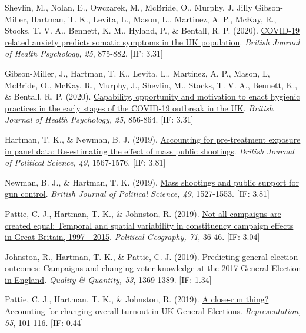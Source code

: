 \documentclass[12pt]{article}
\begin{document}
\begin{bibenum}
	\item Shevlin, M., Nolan, E., Owczarek, M., McBride, O., Murphy, J. Jilly Gibson-Miller, 
	Hartman, T. K., Levita, L., Mason, L., Martinez, A. P., McKay, R., Stocks, T. V. A., 
	Bennett, K. M., Hyland, P., \& Bentall, R. P. (2020). 
		\href{https://10.1111/bjhp.12430}{COVID-19 related anxiety predicts somatic 
		symptoms in the UK population}.
	 	\emph{British Journal of Health Psychology, 25}, 875-882. [IF: 3.31]

	\item Gibson-Miller, J., Hartman, T. K., Levita, L., Martinez, A. P., Mason, L, 
	McBride, O., McKay, R., Murphy, J., Shevlin, M., Stocks, T. V. A., Bennett, K., 
	\& Bentall, R. P. (2020). 
		\href{https://10.1111/bjhp.12426}{Capability, opportunity and motivation 
		to enact hygienic practices in the early stages of the COVID-19 outbreak in the UK}.
		\emph{British Journal of Health Psychology, 25}, 856-864. [IF: 3.31]
		
    \item *{Hartman, T. K.}, \& Newman, B. J. (2019).
          \href{https://10.1017/S0007123418000467}
          {Accounting for pre-treatment exposure in panel data: 
          Re-estimating the effect of mass public shootings}.
          \emph{British Journal of Political Science, 49}, 1567-1576. [IF: 3.81]

    \item *Newman, B. J., \& {Hartman, T. K.} (2019).
          \href{https://10.1017/S0007123417000333}
          {Mass shootings and public support for gun control}.
          \emph{British Journal of Political Science, 49}, 1527-1553. [IF: 3.81]
      
	\item Pattie, C. J., {Hartman, T. K.}, \& Johnston, R. (2019). 
	    \href{https://10.1016/j.polgeo.2019.02.010}
		{Not all campaigns are created equal: Temporal and spatial variability 
		in constituency campaign effects in Great Britain, 1997 - 2015}. 
	 	\emph{Political Geography, 71}, 36-46. [IF: 3.04]
	 	    
	\item Johnston, R., {Hartman, T. K.}, \& Pattie, C. J. (2019). 
		\href{https://10.1007/s11135-018-0819-1}
		{Predicting general election outcomes: Campaigns and changing voter 
		knowledge at the 2017 General Election in England}.
		\emph{Quality \& Quantity, 53}, 1369-1389. [IF: 1.34]
	 	    
    \item Pattie, C. J., {Hartman, T. K.}, \& Johnston, R. (2019).
    	\href{https://10.1080/00344893.2018.1555676}
    	{A close-run thing? Accounting for changing overall turnout in UK General Elections}.
    	\emph{Representation, 55}, 101-116. [IF: 0.44]


\end{bibenum}
\end{document}
